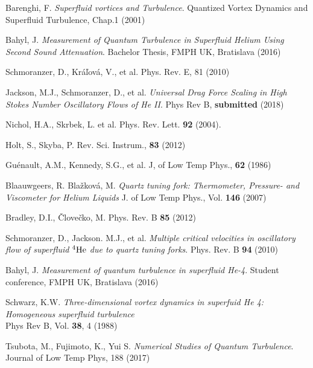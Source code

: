 \begin{thebibliography}{99}
	{\sc Barenghi, F.}
	\emph{Superfluid vortices and Turbulence}. Quantized Vortex Dynamics and Superfluid Turbulence, Chap.1 (2001)

	{\sc Bahyl, J.}
	\emph{Measurement of Quantum Turbulence in Superfluid Helium Using Second Sound Attenuation}.
	Bachelor Thesis, FMPH UK, Bratislava (2016)

	{\sc Schmoranzer, D., Kráľová, V., et al.}
	\emph{}	Phys. Rev. E, 81 (2010)

	{\sc Jackson, M.J., Schmoranzer, D., et al.}
	\emph{Universal Drag Force Scaling in High Stokes Number Oscillatory Flows of He II}. Phys Rev B, \textbf{submitted} (2018)

	{\sc Nichol, H.A., Skrbek, L. et al.}
	\emph{} Phys. Rev. Lett. \textbf{92} (2004).


	{\sc Holt, S., Skyba, P.}
	\emph{} Rev. Sci. Instrum., \textbf{83} (2012)

	{\sc Guénault, A.M., Kennedy, S.G., et al.}
	\emph{} J, of Low Temp Phys., \textbf{62} (1986)

	{\sc Blaauwgeers, R. Blažková, M.} 
	\emph{Quartz tuning fork: Thermometer, Pressure- and Viscometer for Helium Liquids} J. of Low Temp Phys., Vol. \textbf{146} (2007)

	{\sc Bradley, D.I., Človečko, M.} 
	\emph{} Phys. Rev. B \textbf{85} (2012)

	{\sc Schmoranzer, D., Jackson. M.J., et al.}
	\emph{Multiple critical velocities in oscillatory flow of superfluid ${}^4\mathrm{He}$ due to quartz tuning forks}.
	Phys. Rev. B \textbf{94} (2010)

	{\sc Bahyl, J.}
	\emph{Measurement of quantum turbulence in superfluid He-4}.
	Student conference, FMPH UK, Bratislava (2016)


	{\sc Schwarz, K.W.}
	\emph{Three-dimensional vortex dynamics in superfuid He 4: Homogeneous superfluid turbulence}\\
	Phys Rev B, Vol. \textbf{38}, 4 (1988)

	{\sc Tsubota, M., Fujimoto, K., Yui S.}
	\emph{Numerical Studies of Quantum Turbulence}.\\
	Journal of Low Temp Phys, 188 (2017)


\end{thebibliography}
